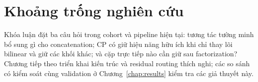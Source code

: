 \section{Khoảng trống nghiên cứu}
Khóa luận đặt ba câu hỏi trong cohort và pipeline hiện tại: tương tác tường minh bổ sung gì cho concatenation; CP có giữ hiệu năng hữu ích khi chỉ thay lõi bilinear và giữ các khối khác; và cặp trực tiếp nào cần giữ sau factorization? Chương tiếp theo triển khai kiến trúc và residual routing thích nghi; các so sánh có kiểm soát cùng validation ở Chương~\ref{chap:results} kiểm tra các giả thuyết này.
